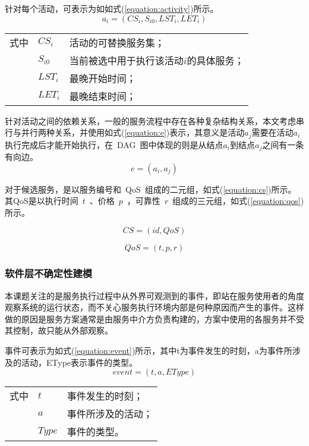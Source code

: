 针对每个活动，可表示为如如式(\ref{equation:activity})所示。
\begin{equation}\label{equation:activity}
{a_i} = ({CS_i}, {S_{i0}}, {LST_i}, {LET_i})
\end{equation}
\begin{tabularx}{\textwidth}{@{}l@{\quad}l@{\pozhehao }X@{}}
    式中
    & ${CS_i}$ & 活动的可替换服务集；\\
    & ${S_{i0}}$ & 当前被选中用于执行该活动$i$的具体服务；\\
    & ${LST_i}$ & 最晚开始时间；\\
    & ${LET_i}$ & 最晚结束时间；
\end{tabularx}\vspace{\wordsep}

针对活动之间的依赖关系，一般的服务流程中存在各种复杂结构关系，本文考虑串行与并行两种关系，并使用如式(\ref{equation:e})表示，其意义是活动${a_j}$需要在活动${a_i}$执行完成后才能开始执行，在~DAG~图中体现的则是从结点${a_i}$到结点${a_j}$之间有一条有向边。
\begin{equation}\label{equation:e}
e = ({a_i},{a_j})
\end{equation}

对于候选服务，是以服务编号和~QoS~组成的二元组，如式(\ref{equation:cs})所示。其QoS是以执行时间~$t$~、价格~$p$~，可靠性~$r$~组成的三元组，如式(\ref{equation:qos})所示。

\begin{equation}\label{equation:cs}
CS = (id, QoS)
\end{equation}

\begin{equation}\label{equation:qos}
QoS = (t, p, r)
\end{equation}

\subsubsection{软件层不确定性建模}
本课题关注的是服务执行过程中从外界可观测到的事件，即站在服务使用者的角度观察系统的运行状态，而不关心服务执行环境内部是何种原因而产生的事件。这样做的原因是服务方案通常是由服务中介方负责构建的，方案中使用的各服务并不受其控制，故只能从外部观察。

事件可表示为如式(\ref{equation:event})所示，其中t为事件发生的时刻，a为事件所涉及的活动，EType表示事件的类型。
\begin{equation}\label{equation:event}
event = (t, a, EType)
\end{equation}
\begin{tabularx}{\textwidth}{@{}l@{\quad}l@{\pozhehao }X@{}}
    式中
    & $t$ & 事件发生的时刻；\\
    & $a$ & 事件所涉及的活动；\\
    & $Type$ &事件的类型。
\end{tabularx}\vspace{\wordsep}


